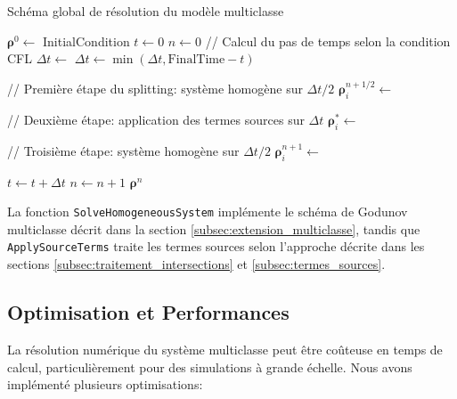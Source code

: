 \begin{algorithm}[htbp]
\caption{Schéma global de résolution du modèle multiclasse}
\begin{algorithmic}[1]
    \State $\boldsymbol{\rho}^0 \gets$ InitialCondition
    \State $t \gets 0$
    \State $n \gets 0$
        \State // Calcul du pas de temps selon la condition CFL
        \State $\Delta t \gets$ 
        \State $\Delta t \gets \min(\Delta t, \text{FinalTime} - t)$
        
        \State // Première étape du splitting: système homogène sur $\Delta t/2$
            \State $\boldsymbol{\rho}_i^{n+1/2} \gets$ 
        \EndFor
        
        \State // Deuxième étape: application des termes sources sur $\Delta t$
            \State $\boldsymbol{\rho}_i^* \gets$ 
        \EndFor
        
        \State // Troisième étape: système homogène sur $\Delta t/2$
            \State $\boldsymbol{\rho}_i^{n+1} \gets$ 
        \EndFor
        
        \State $t \gets t + \Delta t$
        \State $n \gets n + 1$
    \EndWhile
    \State \Return $\boldsymbol{\rho}^n$
\EndFunction
\end{algorithmic}
\label{alg:global}
\end{algorithm}

La fonction \texttt{SolveHomogeneousSystem} implémente le schéma de Godunov multiclasse décrit dans la section \ref{subsec:extension_multiclasse}, tandis que \texttt{ApplySourceTerms} traite les termes sources selon l'approche décrite dans les sections \ref{subsec:traitement_intersections} et \ref{subsec:termes_sources}.

\subsection{Optimisation et Performances}
\label{subsec:optimisation}

La résolution numérique du système multiclasse peut être coûteuse en temps de calcul, particulièrement pour des simulations à grande échelle. Nous avons implémenté plusieurs optimisations:


